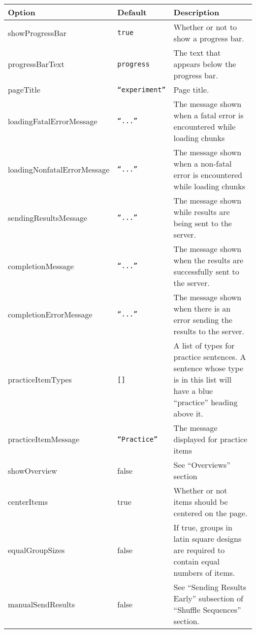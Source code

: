 \documentclass[11pt,letterpaper]{article}
\begin{document}
\footnotesize
\begin{RaggedRight}
\sloppy
\begin{tabular}{|p{1.2196in}|p{1.0392in}|p{3.2413in}|}
\hline
 \textbf{Option}  &  \textbf{Default}  &  \textbf{Description} \\
\hline
 showProgressBar  &  \texttt{true}  &  Whether or not to show a progress bar. \\
\hline
 progressBarText  &  \texttt{progress}  &  The text that appears below the progress bar. \\
\hline
 pageTitle  &  \texttt{``experiment''}  &  Page title. \\
\hline
 loadingFatalErrorMessage  &  \texttt{``...''}  &  The message shown when a fatal error is encountered while loading chunks \\
\hline
 loadingNonfatalErrorMessage  &  \texttt{``...''}  &  The message shown when a non-fatal error is encountered while loading chunks \\
\hline
 sendingResultsMessage  &  \texttt{``...''}  &  The message shown while results are being sent to the server. \\
\hline
 completionMessage  &  \texttt{``...''}  &  The message shown when the results are successfully sent to the server. \\
\hline
 completionErrorMessage  &  \texttt{``...''}  &  The message shown when there is an error sending the results to the server. \\
\hline
 practiceItemTypes  &  \texttt{{[}{]}}  &  A list of types for practice sentences. A sentence whose type is in this list will have a blue ``practice'' heading above it. \\
\hline
 practiceItemMessage  &  \texttt{``Practice''}  &  The message displayed for practice items \\
\hline
 showOverview  &  false  &  See ``Overviews'' section \\
\hline
 centerItems  &  true  &  Whether or not items should be centered on the page. \\
\hline
 equalGroupSizes  &  false  &  If true, groups in latin square designs are required to contain equal numbers of items. \\
\hline
 manualSendResults  &  false  &  See ``Sending Results Early'' subsection of ``Shuffle Sequences'' section. 
\\\hline
\end{tabular}
\end{RaggedRight}
\fussy
\end{document}
